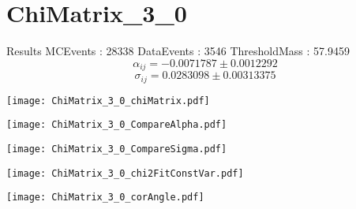\documentclass[a4paper,12pt]{article}
\begin{document}
\section{ChiMatrix\_3\_0}
\begin{minipage}{0.49\linewidth} Results \newline
MCEvents : 28338\newline
DataEvents : 3546 \newline
ThresholdMass : 57.9459\\
$$\alpha_{ij} = -0.0071787\pm 0.0012292$$
$$\sigma_{ij} = 0.0283098\pm 0.00313375$$
\end{minipage}\hfill
\begin{minipage}{0.49\linewidth} 
\texttt{[image: ChiMatrix\_3\_0\_chiMatrix.pdf]}\\
\end{minipage}
\hfill
\begin{minipage}{0.49\linewidth} 
\texttt{[image: ChiMatrix\_3\_0\_CompareAlpha.pdf]}\\
\end{minipage}
\hfill
\begin{minipage}{0.49\linewidth} 
\texttt{[image: ChiMatrix\_3\_0\_CompareSigma.pdf]}\\
\end{minipage}
\begin{minipage}{0.49\linewidth} 
\texttt{[image: ChiMatrix\_3\_0\_chi2FitConstVar.pdf]}\\
\end{minipage}
\hfill
\begin{minipage}{0.49\linewidth} 
\texttt{[image: ChiMatrix\_3\_0\_corAngle.pdf]}\\
\end{minipage}
\end{document}
